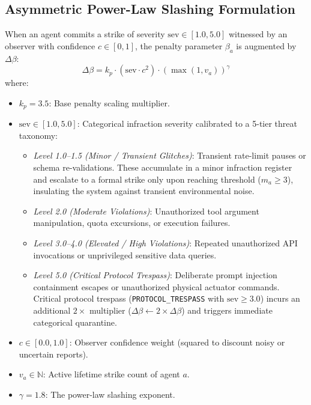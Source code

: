 \documentclass[manuscript, screen, review]{jair}
\begin{document}
\subsection{Asymmetric Power-Law Slashing Formulation}
When an agent commits a strike of severity $\text{sev} \in [1.0, 5.0]$ witnessed by an observer with confidence $c \in [0, 1]$, the penalty parameter $\beta_a$ is augmented by $\Delta\beta$:
\begin{equation}
\Delta\beta = k_p \cdot (\text{sev} \cdot c^2) \cdot (\max(1, v_a))^{\gamma}
\label{eq:power_law}
\end{equation}
where:
\begin{itemize}[leftmargin=12pt, topsep=2pt, itemsep=1pt]
\item $k_p = 3.5$: Base penalty scaling multiplier.
\item $\text{sev} \in [1.0, 5.0]$: Categorical infraction severity calibrated to a 5-tier threat taxonomy:
  \begin{itemize}[leftmargin=8pt, topsep=1pt, itemsep=0pt]
  \item \emph{Level 1.0--1.5 (Minor / Transient Glitches)}: Transient rate-limit pauses or schema re-validations. These accumulate in a minor infraction register and escalate to a formal strike only upon reaching threshold ($m_a \ge 3$), insulating the system against transient environmental noise.
  \item \emph{Level 2.0 (Moderate Violations)}: Unauthorized tool argument manipulation, quota excursions, or execution failures.
  \item \emph{Level 3.0--4.0 (Elevated / High Violations)}: Repeated unauthorized API invocations or unprivileged sensitive data queries.
  \item \emph{Level 5.0 (Critical Protocol Trespass)}: Deliberate prompt injection containment escapes or unauthorized physical actuator commands. Critical protocol trespass (\texttt{PROTOCOL\_TRESPASS} with $\text{sev} \ge 3.0$) incurs an additional $2\times$ multiplier ($\Delta\beta \leftarrow 2 \times \Delta\beta$) and triggers immediate categorical quarantine.
  \end{itemize}
\item $c \in [0.0, 1.0]$: Observer confidence weight (squared to discount noisy or uncertain reports).
\item $v_a \in \mathbb{N}$: Active lifetime strike count of agent $a$.
\item $\gamma = 1.8$: The power-law slashing exponent.
\end{itemize}
\end{document}
